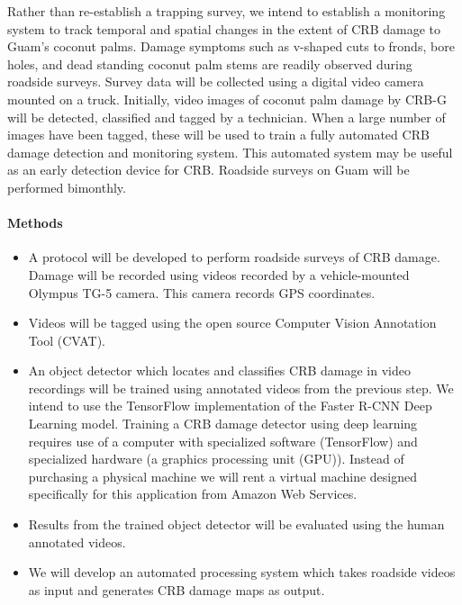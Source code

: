 \documentclass[14pt,english,letterpaper]{scrartcl}
\begin{document}
Rather than re-establish a trapping survey, we intend to establish a monitoring system
to track temporal and spatial changes in the extent of CRB damage to Guam’s coconut palms. Damage
symptoms such as v-shaped cuts to fronds, bore holes, and dead standing coconut palm stems are
readily observed during roadside surveys. Survey data will be collected using a digital video
camera mounted on a truck. Initially, video images of coconut palm damage by CRB-G will be detected,
classified and tagged by a technician. When a large number of images have been tagged, these will be
used to train a fully automated CRB damage detection and monitoring system. This automated system
may be useful as an early detection device for CRB. Roadside surveys on Guam will be performed
bimonthly.

\paragraph{Methods}

\begin{itemize}
	
	\item A protocol will be developed to perform roadside surveys of CRB damage. Damage will be recorded using videos recorded by a vehicle-mounted Olympus TG-5 camera. This camera records GPS coordinates.
	
	\item Videos will be tagged using the open source Computer Vision Annotation Tool (CVAT).
	
	\item An object detector which locates and classifies CRB damage in video recordings will be trained using annotated videos from the previous step. We intend to use the TensorFlow implementation of the Faster R-CNN Deep Learning model. Training a CRB damage detector using deep learning requires use of a computer with specialized software (TensorFlow) and specialized hardware (a graphics processing unit (GPU)). Instead of purchasing a physical machine we will rent a virtual machine designed specifically for this application from Amazon Web Services.
	  
	\item Results from the trained object detector will be evaluated using the human annotated videos.
	
	\item We will develop an automated processing system which takes roadside videos as input and generates CRB damage maps as output.
\end{itemize}
\end{document}
